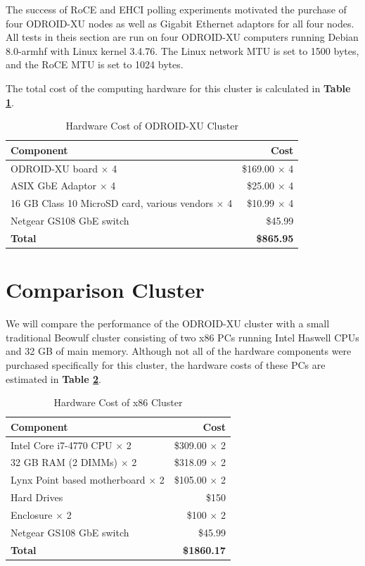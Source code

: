 \documentclass[11pt]{book}
\begin{document}
The success of RoCE and EHCI polling experiments motivated the purchase of four
ODROID-XU nodes as well as Gigabit Ethernet adaptors for all four nodes. All
tests in theis section are run on four ODROID-XU computers running Debian
8.0-armhf with Linux kernel 3.4.76. The Linux network MTU is set to 1500 bytes,
and the RoCE MTU is set to 1024 bytes.

The total cost of the computing hardware for this cluster is calculated in
\textbf{Table \ref{xu-cost-table}}.

\begin{table}
  \caption{Hardware Cost of ODROID-XU Cluster}
  \label{xu-cost-table}
  \centering
  \begin{tabular}{| l | r |}
    \hline
    \textbf{Component} & \textbf{Cost} \\ \hline
    ODROID-XU board $\times$ 4 & \$169.00 $\times$ 4 \\
    ASIX GbE Adaptor $\times$ 4 & \$25.00 $\times$ 4 \\
    16 GB Class 10 MicroSD card, various vendors $\times$ 4 & \$10.99 $\times$ 4 \\
    Netgear GS108 GbE switch & \$45.99 \\
    \hline
    \textbf{Total} & \textbf{\$865.95} \\ \hline
  \end{tabular}
\end{table}

\section{\textbf{Comparison Cluster}}

We will compare the performance of the ODROID-XU cluster with a small
traditional Beowulf cluster consisting of two x86 PCs running Intel Haswell CPUs
and 32 GB of main memory. Although not all of the hardware components were
purchased specifically for this cluster, the hardware costs of these PCs are
estimated in \textbf{Table \ref{x86-cost-table}}.

\begin{table}
  \caption{Hardware Cost of x86 Cluster}
  \label{x86-cost-table}
  \centering
  \begin{tabular}{| l | r |}
    \hline
    \textbf{Component} & \textbf{Cost} \\
    \hline
    Intel Core i7-4770 CPU $\times$ 2 & \$309.00 $\times$ 2 \\
    32 GB RAM (2 DIMMs) $\times$ 2 & \$318.09 $\times$ 2 \\
    Lynx Point based motherboard $\times$ 2 & \$105.00 $\times$ 2 \\
    Hard Drives & \$150 \\
    Enclosure $\times$ 2 & \$100 $\times$ 2 \\
    Netgear GS108 GbE switch & \$45.99 \\
    \hline
    \textbf{Total} & \textbf{\$1860.17} \\ \hline
  \end{tabular}
\end{table}
\end{document}
